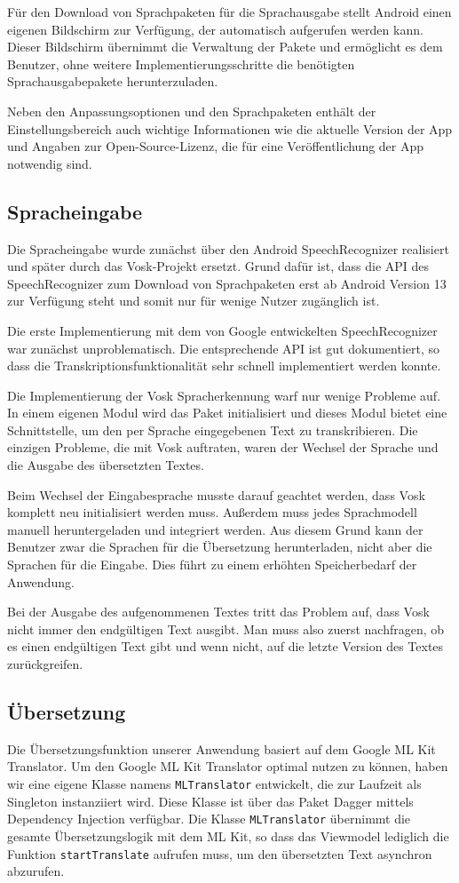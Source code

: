 Für den Download von Sprachpaketen für die Sprachausgabe stellt Android einen eigenen Bildschirm zur Verfügung, der automatisch aufgerufen werden kann. Dieser Bildschirm übernimmt die Verwaltung der Pakete und ermöglicht es dem Benutzer, ohne weitere Implementierungsschritte die benötigten Sprachausgabepakete herunterzuladen.

Neben den Anpassungsoptionen und den Sprachpaketen enthält der Einstellungsbereich auch wichtige Informationen wie die aktuelle Version der App und Angaben zur Open-Source-Lizenz, die für eine Veröffentlichung der App notwendig sind.

\subsection{Spracheingabe}
Die Spracheingabe wurde zunächst über den Android SpeechRecognizer realisiert und später durch das Vosk-Projekt ersetzt. Grund dafür ist, dass die API des SpeechRecognizer zum Download von Sprachpaketen erst ab Android Version 13 zur Verfügung steht und somit nur für wenige Nutzer zugänglich ist.

Die erste Implementierung mit dem von Google entwickelten SpeechRecognizer war zunächst unproblematisch. Die entsprechende API ist gut dokumentiert, so dass die Transkriptionsfunktionalität sehr schnell implementiert werden konnte.

Die Implementierung der Vosk Spracherkennung warf nur wenige Probleme auf. In einem eigenen Modul wird das Paket initialisiert und dieses Modul bietet eine Schnittstelle, um den per Sprache eingegebenen Text zu transkribieren. Die einzigen Probleme, die mit Vosk auftraten, waren der Wechsel der Sprache und die Ausgabe des übersetzten Textes.

Beim Wechsel der Eingabesprache musste darauf geachtet werden, dass Vosk komplett neu initialisiert werden muss. Außerdem muss jedes Sprachmodell manuell heruntergeladen und integriert werden. Aus diesem Grund kann der Benutzer zwar die Sprachen für die Übersetzung herunterladen, nicht aber die Sprachen für die Eingabe. Dies führt zu einem erhöhten Speicherbedarf der Anwendung.

Bei der Ausgabe des aufgenommenen Textes tritt das Problem auf, dass Vosk nicht immer den endgültigen Text ausgibt. Man muss also zuerst nachfragen, ob es einen endgültigen Text gibt und wenn nicht, auf die letzte Version des Textes zurückgreifen.

\subsection{Übersetzung}
Die Übersetzungsfunktion unserer Anwendung basiert auf dem Google ML Kit Translator. Um den Google ML Kit Translator optimal nutzen zu können, haben wir eine eigene Klasse namens \texttt{MLTranslator} entwickelt, die zur Laufzeit als Singleton instanziiert wird. Diese Klasse ist über das Paket Dagger mittels Dependency Injection verfügbar. Die Klasse \texttt{MLTranslator} übernimmt die gesamte Übersetzungslogik mit dem ML Kit, so dass das Viewmodel lediglich die Funktion \texttt{startTranslate} aufrufen muss, um den übersetzten Text asynchron abzurufen.

